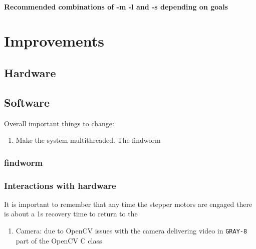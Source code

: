 \documentclass[fullpage]{report}
\begin{document}
\subsubsection{Recommended combinations of -m -l and -s depending on goals}

\chapter{Improvements}
\section{Hardware}
\section{Software}
Overall important things to change:
\begin{enumerate}
\item Make the system multithreaded. The findworm
\end{enumerate}
\subsection{findworm}
\subsection{Interactions with hardware}
It is important to remember that any time the stepper motors are engaged there is about a 1s recovery time to return to the 
\begin{enumerate}
\item Camera: due to OpenCV issues with the camera delivering video in \verb|GRAY-8| part of the OpenCV C class 
\end{enumerate}
\end{document}
